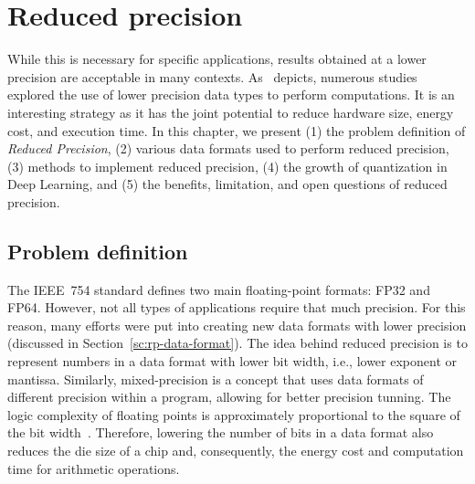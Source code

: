 \chapter{Reduced precision}
\label{ch:reduced-precision}
While this is necessary for specific applications, results obtained at a lower
precision are acceptable in many contexts.
As~\cite{Cherubin2020-tt} depicts, numerous studies explored the use of lower
precision data types to perform computations.
It is an interesting strategy as it has the joint potential to reduce hardware
size, energy cost, and execution time.
In this chapter, we present (1) the problem definition of \textit{Reduced Precision},
(2) various data formats used to perform reduced precision,
(3) methods to implement reduced precision,
(4) the growth of quantization in Deep Learning,
and (5) the benefits, limitation, and open questions of reduced precision.

\section{Problem definition}
\label{sc:rp-problem-definiton}
The IEEE~754 standard defines two main floating-point formats: FP32 and FP64.
However, not all types of applications require that much precision.
For this reason, many efforts were put into creating new data formats with lower precision (discussed in Section~\ref{sc:rp-data-format}).
The idea behind reduced precision is to represent numbers in a data format with
lower bit width, i.e., lower exponent or mantissa.
Similarly, mixed-precision is a concept that uses data formats of different precision within a program, allowing for better precision tunning.
The logic complexity of floating points is approximately proportional to the square of the bit width~\cite{Chen2018-an}.
Therefore, lowering the number of bits in a data format also reduces the die size
of a chip and, consequently, the energy cost and computation time for arithmetic operations.


